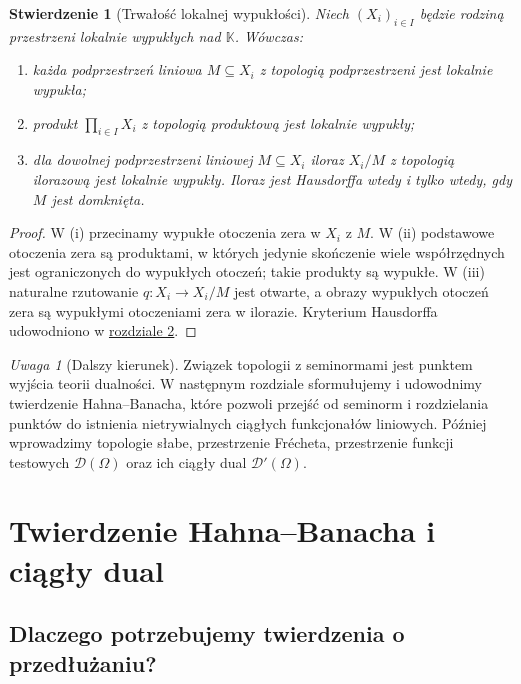\documentclass[11pt,a4paper]{article}
\numberwithin{equation}{section}
\theoremstyle{plain}
\newtheorem{stwierdzenie}[twierdzenie]{Stwierdzenie}
\theoremstyle{definition}
\theoremstyle{remark}
\newtheorem{uwaga}[twierdzenie]{Uwaga}
\newcommand{\K}{\mathbb K}
\begin{document}
\begin{stwierdzenie}[Trwałość lokalnej wypukłości]
\label{prop:lcs-constructions}
Niech $(X_i)_{i\in I}$ będzie rodziną przestrzeni lokalnie
wypukłych nad $\K$. Wówczas:
\begin{enumerate}[label=\textup{(\roman*)}]
\item każda podprzestrzeń liniowa $M\subseteq X_i$ z topologią
podprzestrzeni jest lokalnie wypukła;
\item produkt $\prod_{i\in I}X_i$ z topologią produktową
jest lokalnie wypukły;
\item dla dowolnej podprzestrzeni liniowej $M\subseteq X_i$
iloraz $X_i/M$ z topologią ilorazową jest lokalnie wypukły.
Iloraz jest Hausdorffa wtedy i tylko wtedy, gdy $M$ jest domknięta.
\end{enumerate}
\end{stwierdzenie}
\begin{proof}
W (i) przecinamy wypukłe otoczenia zera w $X_i$
z $M$. W (ii) podstawowe otoczenia zera są produktami,
w których jedynie skończenie wiele współrzędnych
jest ograniczonych do wypukłych otoczeń; takie produkty
są wypukłe. W (iii) naturalne rzutowanie
$q:X_i\to X_i/M$ jest otwarte, a obrazy wypukłych
otoczeń zera są wypukłymi otoczeniami zera w ilorazie.
Kryterium Hausdorffa udowodniono w
\hyperref[sec:konstrukcje]{rozdziale 2}.
\end{proof}

\begin{uwaga}[Dalszy kierunek]
Związek topologii z seminormami jest punktem wyjścia
teorii dualności. W następnym rozdziale sformułujemy i
udowodnimy twierdzenie Hahna--Banacha, które pozwoli
przejść od seminorm i rozdzielania punktów do istnienia
nietrywialnych ciągłych funkcjonałów liniowych.
Później wprowadzimy topologie słabe, przestrzenie Frécheta,
przestrzenie funkcji testowych $\mathcal D(\Omega)$ oraz ich
ciągły dual $\mathcal D'(\Omega)$.
\end{uwaga}


\setcounter{section}{5}
\section{Twierdzenie Hahna--Banacha i ciągły dual}\label{sec:hahn-banach}

\subsection{Dlaczego potrzebujemy twierdzenia o przedłużaniu?}
\end{document}
